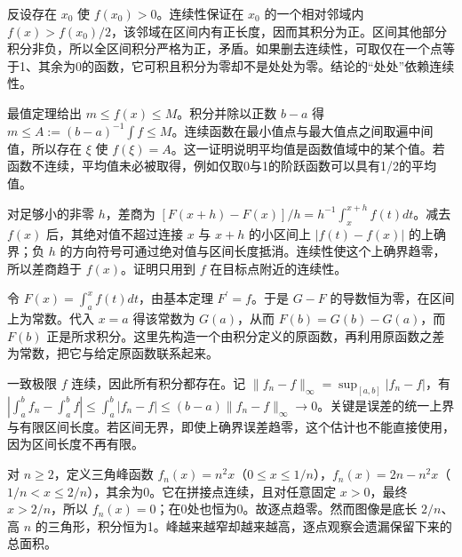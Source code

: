 \documentclass[UTF8,12pt,a4paper,fontset=fandol]{ctexart}
\begin{document}
\begin{solve}\label{ans:c30q6}
反设存在 $x_0$ 使 $f(x_0)>0$。连续性保证在 $x_0$ 的一个相对邻域内 $f(x)>f(x_0)/2$，该邻域在区间内有正长度，因而其积分为正。区间其他部分积分非负，所以全区间积分严格为正，矛盾。如果删去连续性，可取仅在一个点等于1、其余为0的函数，它可积且积分为零却不是处处为零。结论的“处处”依赖连续性。
\end{solve}

\begin{solve}\label{ans:c30q7}
最值定理给出 $m\le f(x)\le M$。积分并除以正数 $b-a$ 得 $m\le A:=(b-a)^{-1}\int f\le M$。连续函数在最小值点与最大值点之间取遍中间值，所以存在 $\xi$ 使 $f(\xi)=A$。这一证明说明平均值是函数值域中的某个值。若函数不连续，平均值未必被取得，例如仅取0与1的阶跃函数可以具有1/2的平均值。
\end{solve}

\begin{solve}\label{ans:c30q8}
对足够小的非零 $h$，差商为 $[F(x+h)-F(x)]/h=h^{-1}\int_x^{x+h}f(t)dt$。减去 $f(x)$ 后，其绝对值不超过连接 $x$ 与 $x+h$ 的小区间上 $|f(t)-f(x)|$ 的上确界；负 $h$ 的方向符号可通过绝对值与区间长度抵消。连续性使这个上确界趋零，所以差商趋于 $f(x)$。证明只用到 $f$ 在目标点附近的连续性。
\end{solve}

\begin{solve}\label{ans:c30q9}
令 $F(x)=\int_a^xf(t)dt$，由基本定理 $F^{\prime}=f$。于是 $G-F$ 的导数恒为零，在区间上为常数。代入 $x=a$ 得该常数为 $G(a)$，从而 $F(b)=G(b)-G(a)$，而 $F(b)$ 正是所求积分。这里先构造一个由积分定义的原函数，再利用原函数之差为常数，把它与给定原函数联系起来。
\end{solve}

\begin{solve}\label{ans:c30q10}
一致极限 $f$ 连续，因此所有积分都存在。记 $\|f_n-f\|_\infty=\sup_{[a,b]}|f_n-f|$，有 $|\int_a^bf_n-\int_a^bf|\le\int_a^b|f_n-f|\le(b-a)\|f_n-f\|_\infty\to0$。关键是误差的统一上界与有限区间长度。若区间无界，即使上确界误差趋零，这个估计也不能直接使用，因为区间长度不再有限。
\end{solve}

\begin{solve}\label{ans:c30q11}
对 $n\ge2$，定义三角峰函数 $f_n(x)=n^2x$（$0\le x\le1/n$），$f_n(x)=2n-n^2x$（$1/n<x\le2/n$），其余为0。它在拼接点连续，且对任意固定 $x>0$，最终 $x>2/n$，所以 $f_n(x)=0$；在0处也恒为0。故逐点趋零。然而图像是底长 $2/n$、高 $n$ 的三角形，积分恒为1。峰越来越窄却越来越高，逐点观察会遗漏保留下来的总面积。
\end{solve}
\end{document}
